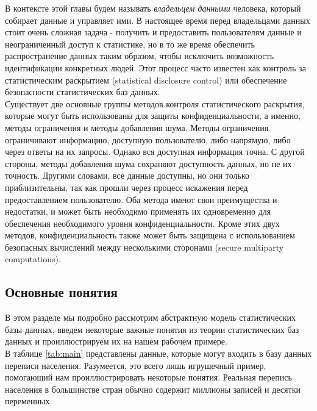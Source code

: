 В контексте этой главы будем называть \textit{владельцем данными} человека, который собирает данные и управляет ими.
В настоящее время перед владельцами данных стоит очень сложная задача - получить и предоставить
пользователям данные и неограниченный доступ к статистике, но в то же время обеспечить распространение данных таким образом, чтобы исключить возможность идентификации конкретных людей. Этот процесс часто известен как контроль за статистическим раскрытием (statistical disclosure control) или обеспечение безопасности статистических баз данных.
\\

Существует две основные группы методов контроля статистического раскрытия, которые могут быть использованы для защиты конфиденциальности, а именно, методы ограничения и методы добавления шума. Методы ограничения ограничивают информацию, доступную пользователю, либо напрямую, либо через ответы на их запросы. Однако вся доступная информация точна. С другой стороны, методы добавления шума сохраняют доступность данных, но не их точность. Другими словами, все данные доступны, но они только приблизительны, так как прошли через процесс искажения перед предоставлением пользователю. Оба метода имеют свои преимущества и недостатки, и может быть необходимо применять их одновременно для обеспечения необходимого уровня конфиденциальности. Кроме этих двух методов, конфиденциальность также может быть защищена с использованием безопасных вычислений между несколькими сторонами (secure multiparty computations).
\\

\subsection{Основные понятия}
В этом разделе мы подробно рассмотрим абстрактную модель статистических базы данных, введем некоторые важные понятия из теории статистических баз данных и проиллюстрируем их на нашем рабочем примере.
\\

В таблице \ref{tab:main} представлены данные, которые могут входить в базу данных переписи населения. Разумеется, это всего лишь игрушечный пример, помогающий нам проиллюстрировать некоторые понятия. Реальная перепись населения в большинстве стран обычно содержит миллионы записей и десятки переменных.
\\


